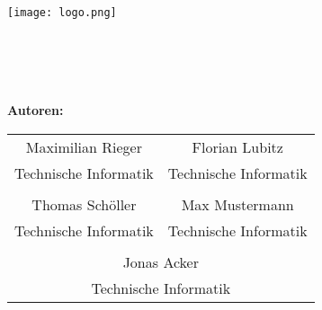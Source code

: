 \begin{titlepage}

\begin{center}
\texttt{[image: logo.png]}\\[5ex]


\LARGE{\betreff}\\[4ex]

\huge{\textbf{\titel}}\\[1.5ex]
\Large{\untertitel}\\[4ex]

\normalsize

\begin{tabular}{c c}

\end{tabular}

\textbf{\Large{Autoren:}}\\
    \begin{tabular}{c c}
        \\
        Maximilian Rieger & Florian Lubitz\\
        Technische Informatik & Technische Informatik\\
        \\
        Thomas Schöller & Max Mustermann\\
        Technische Informatik & Technische Informatik\\
        \\
        \multicolumn{2}{c}{Jonas Acker}\\
        \multicolumn{2}{c}{Technische Informatik}\\
    \end{tabular}
\\[3ex]

\end{center}

\end{titlepage}